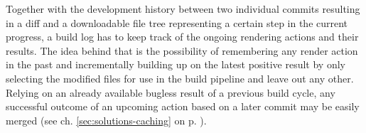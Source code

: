 Together with the development history between two individual commits resulting in a diff and a downloadable file tree representing a certain step in the current progress, a build log has to keep track of the ongoing rendering actions and their results. The idea behind that is the possibility of remembering any render action in the past and incrementally building up on the latest positive result by only selecting the modified files for use in the build pipeline and leave out any other. Relying on an already available bugless result of a previous build cycle, any successful outcome of an upcoming action based on a later commit may be easily merged (see ch. \ref{sec:solutions-caching} on p. \pageref{sec:solutions-caching}).
